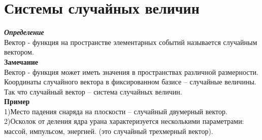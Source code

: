 \documentclass[russian, 12pt, fleqn]{article}
\begin{document}
\section{Системы случайных величин}
\noindent
\textit{\textbf{Определение}}\\
Вектор - функция на пространстве элементарных событий называется случайным вектором.\\
\textbf{Замечание\ } \\
Вектор - функция может иметь значения в пространствах различной размерности.\\
Координаты случайного вектора в фиксированном базисе -- случайные величины. Так что случайный вектор -- система случайных величин.\\
\textbf{Пример}\\
1)Место падения снаряда на плоскости -- случайный двумерный вектор.\\
2)Осколок от деления ядра урана характеризуется несколькими параметрами: массой, импульсом, энергией. (это случайный трехмерный вектор).
\end{document}
